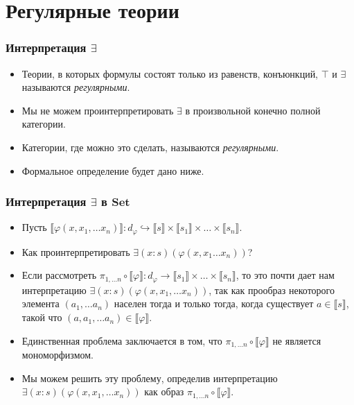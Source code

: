 \documentclass{beamer}
\theoremstyle{definition}
\newcommand{\cat}[1]{\mathbf{#1}}
\newcommand{\Set}{\cat{Set}}
\renewcommand{\ll}{\llbracket}
\newcommand{\rr}{\rrbracket}
\begin{document}
\section{Регулярные теории}

\begin{frame}
\frametitle{Интерпретация $\exists$}
\begin{itemize}
\item Теории, в которых формулы состоят только из равенств, конъюнкций, $\top$ и $\exists$ называются \emph{регулярными}.
\item Мы не можем проинтерпретировать $\exists$ в произвольной конечно полной категории.
\item Категории, где можно это сделать, называются \emph{регулярными}.
\item Формальное определение будет дано ниже.
\end{itemize}
\end{frame}

\begin{frame}
\frametitle{Интерпретация $\exists$ в $\Set$}
\begin{itemize}
\item Пусть $\ll \varphi(x, x_1, \ldots x_n) \rr : d_\varphi \hookrightarrow \ll s \rr \times \ll s_1 \rr \times \ldots \times \ll s_n \rr$.
\item Как проинтерпретировать $\exists (x : s) (\varphi(x, x_1 \ldots x_n))$?
\item Если рассмотреть $\pi_{1, \ldots n} \circ \ll \varphi \rr : d_\varphi \to \ll s_1 \rr \times \ldots \times \ll s_n \rr$, то это почти дает нам интерпретацию $\exists (x : s) (\varphi(x, x_1, \ldots x_n))$,
так как прообраз некоторого элемента $(a_1, \ldots a_n)$ населен тогда и только тогда, когда существует $a \in \ll s \rr$, такой что $(a, a_1, \ldots a_n) \in \ll \varphi \rr$.
\item Единственная проблема заключается в том, что $\pi_{1, \ldots n} \circ \ll \varphi \rr$ не является мономорфизмом.
\item Мы можем решить эту проблему, определив интерпретацию $\exists (x : s) (\varphi(x, x_1, \ldots x_n))$ как образ $\pi_{1, \ldots n} \circ \ll \varphi \rr$.
\end{itemize}
\end{frame}
\end{document}
